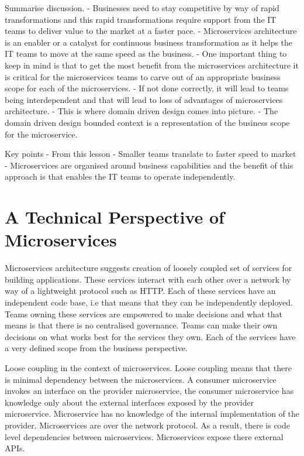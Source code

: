 \documentclass[a4paper, 11pt]{book}
\begin{document}
    Summarise discussion.
    - Businesses need to stay competitive by way of rapid transformations and this rapid transformations require support from the IT teams to deliver value to the market at a faster pace.
    - Microservices architecture is an enabler or a catalyst for continuous business transformation as it helps the IT teams to move at the same speed as the business.
    - One important thing to keep in mind is that to get the most benefit from the microservices architecture it is critical for the microservices teams to carve out of an appropriate business scope for each of the microservices.
    - If not done correctly, it will lead to teams being interdependent and that will lead to loss of advantages of microservices architecture.
    - This is where domain driven design comes into picture.
    - The domain driven design bounded context is a representation of the business scope for the microservice.

    Key points
    - From this lesson
    - Smaller teams translate to faster speed to market
    - Microservices are organised around business capabilities and the benefit of this approach is that enables the IT teams to operate independently.


    \section{A Technical Perspective of Microservices}

    Microservices architecture suggests creation of loosely coupled set of services for building applications.
    These services interact with each other over a network by way of a lightweight protocol such as HTTP\@.
    Each of these services have an independent code base, i.e that means that they can be independently deployed.
    Teams owning these services are empowered to make decisions and what that means is that there is no centralised governance.
    Teams can make their own decisions on what works best for the services they own.
    Each of the services have a very defined scope from the business perspective.

    Loose coupling in the context of microservices.
    Loose coupling means that there is minimal dependency between the microservices.
    A consumer microservice invokes an interface on the provider microservice, the consumer microservice has knowledge only about the external interfaces exposed by the provider microservice.
    Microservice has no knowledge of the internal implementation of the provider.
    Microservices are over the network protocol.
    As a result, there is code level dependencies between microservices.
    Microservices expose there external APIs.
\end{document}
